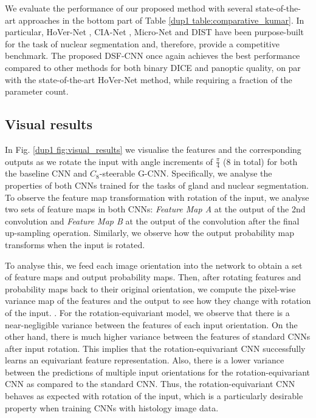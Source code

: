 \documentclass[journal]{IEEEtran}
\newcommand\mg[1]{{\color{black}{#1}}}
\begin{document}
	    We evaluate the performance of our proposed method with several state-of-the-art approaches in the bottom part of Table \ref{dup1 table:comparative_kumar}. In particular, HoVer-Net \cite{graham2019hover}, CIA-Net \cite{zhou2019cia}, Micro-Net \cite{raza2019micro} and DIST \cite{naylor2018segmentation} have been purpose-built for the task of nuclear segmentation and, therefore, provide a competitive benchmark. The proposed DSF-CNN once again achieves the best performance compared to other methods for both binary DICE and panoptic quality, on par with the state-of-the-art HoVer-Net method, while requiring a fraction of the parameter count.
	    
	    \subsection{Visual results} \label{dup1 section:comparison_equiv_viz}
	    In Fig. \ref{dup1 fig:visual_results} we visualise the features and the corresponding outputs as we rotate the input with angle increments of $\frac{\pi}{4}$ (8 in total) for both the baseline CNN and $C_8$-steerable G-CNN. Specifically, we analyse the properties of both CNNs trained for the tasks of gland and nuclear segmentation.
To observe the feature map transformation with rotation of the input, we analyse two sets of feature maps in both CNNs: {\em Feature Map A} at the output of the 2nd convolution and {\em Feature Map B} at the output of the convolution after the final up-sampling operation. 
Similarly, we observe how the output probability map transforms when the input is rotated. 
	    
	    To analyse this, we feed each image orientation into the network to obtain a set of feature maps and output probability maps. Then, after rotating features and probability maps back to their original orientation, we compute the pixel-wise variance map of the features and the output to see how they change with rotation of the input. \mg{$G$-CNN feature maps are a function on $G$ and therefore we visualise a single planar feature map within the group}. For the rotation-equivariant model, we observe that there is a near-negligible variance between the features of each input orientation. On the other hand, there is much higher variance between the features of standard CNNs after input rotation. This implies that the rotation-equivariant CNN successfully learns an equivariant feature representation. Also, there is a lower variance between the predictions of multiple input orientations for the rotation-equivariant CNN as compared to the standard CNN. Thus, the rotation-equivariant CNN behaves as expected with rotation of the input, which is a particularly desirable property when training CNNs with histology image data. \mg{It must be noted that features learned by conventional CNNs are highly complex and it is very difficult to infer the relationship between learned features and input rotation. Nonetheless, we demonstrate that rotation-equivariant CNNs have a predictable transformation with input rotation, making them more stable than conventional CNNs.}
	    
\end{document}
